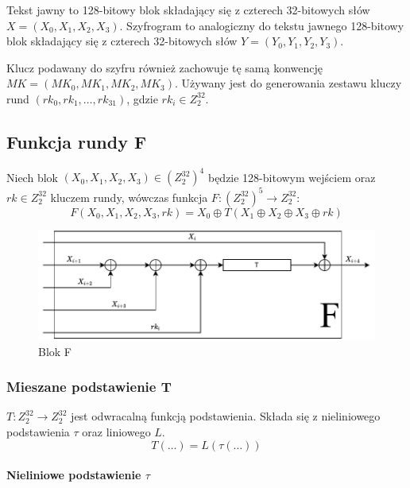 Tekst jawny to 128-bitowy blok składający się z czterech 32-bitowych słów $X = (X_0, X_1, X_2, X_3)$. Szyfrogram to analogiczny do tekstu jawnego 128-bitowy blok składający się z czterech 32-bitowych słów $Y = (Y_0, Y_1, Y_2, Y_3)$.

Klucz podawany do szyfru również zachowuje tę samą konwencję $MK = (MK_0, MK_1, MK_2, MK_3)$. Używany jest do generowania zestawu kluczy rund $(rk_0, rk_1, \ldots, rk_{31})$, gdzie $rk_i \in Z^{32}_2$.

\subsection{Funkcja rundy F}

Niech blok $(X_0, X_1, X_2, X_3) \in (Z^{32}_2)^4$ będzie 128-bitowym wejściem oraz $rk \in Z^{32}_2$ kluczem rundy, wówczas funkcja $F: (Z^{32}_2)^5 \rightarrow Z^{32}_2$:
\begin{equation*}
F(X_0, X_1, X_2, X_3, rk) = X_0 \oplus T(X_1 \oplus X_2 \oplus X_3 \oplus rk)
\end{equation*}

\begin{figure}[h!]
  \centering
  \includegraphics{diagramy/F.pdf}
  \caption{Blok F}
  \label{fig:F}
\end{figure}

\subsubsection{Mieszane podstawienie T}

$T: Z^{32}_2 \rightarrow Z^{32}_2$ jest odwracalną funkcją podstawienia. Składa się z nieliniowego podstawienia $\tau$ oraz liniowego  $L$.
\begin{equation*}
    T(\ldots) = L(\tau(\ldots))
\end{equation*}

\paragraph{Nieliniowe podstawienie $\tau$}\mbox{}

